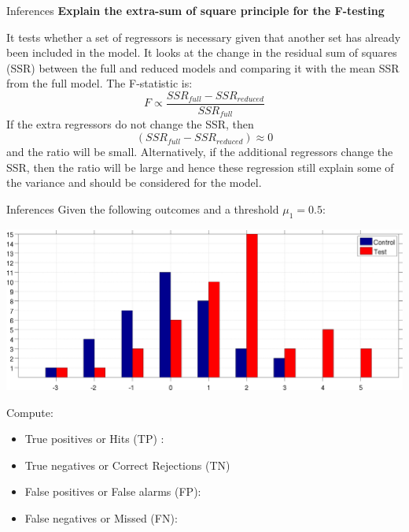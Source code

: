 \documentclass{beamer}
\begin{document}
\begin{frame}{Inferences}
\textbf{Explain the extra-sum of square principle for the F-testing}

\smallskip
It tests whether a set of regressors is necessary given that another set has already been included in the model. It looks at the change in the residual sum of squares (SSR) between the full and reduced models and comparing it with the mean SSR from the full model. The F-statistic is:
  \begin{displaymath}
    F \propto \frac{SSR_{full}-SSR_{reduced}} {SSR_{full}}
  \end{displaymath}
If the extra regressors do not change the SSR, then 
  \begin{displaymath}
    (SSR_{full} - SSR_{reduced}) \approx 0
  \end{displaymath}
 and the ratio will be small. Alternatively, if the additional regressors change the SSR, then the ratio will be large and hence these regression still explain some of the variance and should be considered for the model.
\end{frame}


\begin{frame}{Inferences}
Given the following outcomes and a threshold $\mu_{1} = 0.5$:

  \begin{center}
    \includegraphics[scale=0.055]{./Control_Test.jpg}
  \end{center}

Compute:
  \begin{itemize}
    \item True positives or Hits (TP) :
    \item True negatives or Correct Rejections (TN)
    \item False positives or False alarms (FP):
    \item False negatives or Missed (FN):
  \end{itemize}
\end{frame}
\end{document}

